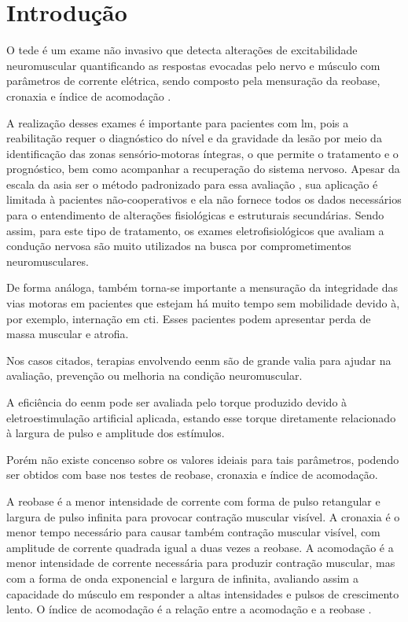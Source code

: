 \section{Introdução}

O \ac{tede} é um exame não invasivo que detecta alterações de excitabilidade neuromuscular quantificando as respostas evocadas pelo nervo e músculo com parâmetros de corrente elétrica, sendo composto pela mensuração da reobase, cronaxia e índice de acomodação \cite{sluga2002,schuhfired2005,lee2013}.

A realização desses exames é importante para pacientes com \ac{lm}, pois a reabilitação requer o diagnóstico do nível e da gravidade da lesão por meio da identificação das zonas sensório-motoras íntegras, o que permite o tratamento e o prognóstico, bem como acompanhar a recuperação do sistema nervoso. Apesar da escala da \ac{asia} ser o método padronizado para essa avaliação \cite{van2011}, sua aplicação é limitada à pacientes não-cooperativos e ela não fornece todos os dados necessários para o entendimento de alterações fisiológicas e estruturais secundárias. Sendo assim, para este tipo de tratamento, os exames eletrofisiológicos que avaliam a condução nervosa são muito utilizados na busca por comprometimentos neuromusculares.

De forma análoga, também torna-se importante a mensuração da integridade das vias motoras em pacientes que estejam há muito tempo sem mobilidade devido à, por exemplo, internação em \ac{cti}. Esses pacientes podem apresentar perda de massa muscular e atrofia.

Nos casos citados, terapias envolvendo \ac{eenm} são de grande valia para ajudar na avaliação, prevenção ou melhoria na condição neuromuscular.

A eficiência do \ac{eenm} pode ser avaliada pelo torque produzido devido à eletroestimulação artificial aplicada, estando esse torque diretamente relacionado à largura de pulso e amplitude dos estímulos.

Porém não existe concenso sobre os valores ideiais para tais parâmetros, podendo ser obtidos com base nos testes de reobase, cronaxia e índice de acomodação. 

A reobase é a menor intensidade de corrente com forma de pulso retangular e largura de pulso infinita para provocar contração muscular visível. A cronaxia é o menor tempo necessário para causar também contração muscular visível, com amplitude de corrente quadrada igual a duas vezes a reobase. A acomodação é a menor intensidade de corrente necessária para produzir contração muscular, mas com a forma de onda exponencial e largura de infinita, avaliando assim a capacidade do músculo em responder a altas intensidades e pulsos de crescimento lento. O índice de acomodação é a relação entre a acomodação e a reobase \cite{sluga2002}.

